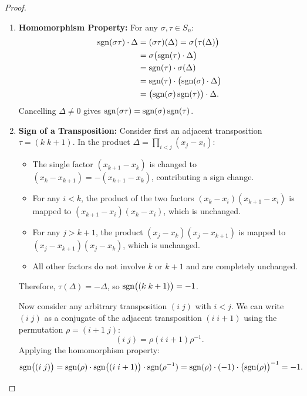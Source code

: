 \begin{proof}
\begin{enumerate}[label=\textbf{(\roman*)}, leftmargin=*, itemsep=8pt]
    \item \textbf{Homomorphism Property:}
    For any $\sigma, \tau \in S_n$:
    \begin{align*}
    \operatorname{sgn}(\sigma \tau) \cdot \Delta &= (\sigma \tau)(\Delta) = \sigma\bigl(\tau(\Delta)\bigr) \\
    &= \sigma\bigl(\operatorname{sgn}(\tau) \cdot \Delta\bigr) \\
    &= \operatorname{sgn}(\tau) \cdot \sigma(\Delta) \\
    &= \operatorname{sgn}(\tau) \cdot \bigl(\operatorname{sgn}(\sigma) \cdot \Delta\bigr) \\
    &= \bigl(\operatorname{sgn}(\sigma)\operatorname{sgn}(\tau)\bigr) \cdot \Delta.
    \end{align*}
    Cancelling $\Delta \ne 0$ gives $\operatorname{sgn}(\sigma \tau) = \operatorname{sgn}(\sigma)\operatorname{sgn}(\tau)$.

    \item \textbf{Sign of a Transposition:}
    Consider first an adjacent transposition $\tau = (k \; k+1)$.
    In the product $\Delta = \prod_{i < j} (x_j - x_i)$:
    \begin{itemize}[leftmargin=1.5em, itemsep=3pt]
        \item The single factor $(x_{k+1} - x_k)$ is changed to $(x_k - x_{k+1}) = -(x_{k+1} - x_k)$, contributing a sign change.
        \item For any $i < k$, the product of the two factors $(x_k - x_i)(x_{k+1} - x_i)$ is mapped to $(x_{k+1} - x_i)(x_k - x_i)$, which is unchanged.
        \item For any $j > k+1$, the product $(x_j - x_k)(x_j - x_{k+1})$ is mapped to $(x_j - x_{k+1})(x_j - x_k)$, which is unchanged.
        \item All other factors do not involve $k$ or $k+1$ and are completely unchanged.
    \end{itemize}
    Therefore, $\tau(\Delta) = -\Delta$, so $\operatorname{sgn}\bigl((k \; k+1)\bigr) = -1$.
    
    Now consider any arbitrary transposition $(i \; j)$ with $i < j$.
    We can write $(i \; j)$ as a conjugate of the adjacent transposition $(i \; i+1)$ using the permutation $\rho = (i+1 \; j)$:
    \begin{equation*}
    (i \; j) = \rho (i \; i+1) \rho^{-1}.
    \end{equation*}
    Applying the homomorphism property:
    \begin{equation*}
    \operatorname{sgn}\bigl((i \; j)\bigr) = \operatorname{sgn}(\rho) \cdot \operatorname{sgn}\bigl((i \; i+1)\bigr) \cdot \operatorname{sgn}(\rho^{-1}) = \operatorname{sgn}(\rho) \cdot (-1) \cdot \bigl(\operatorname{sgn}(\rho)\bigr)^{-1} = -1.
    \end{equation*}


\end{enumerate}
\end{proof}
